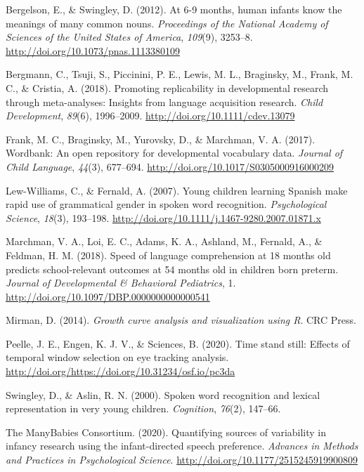 \documentclass[10pt, letterpaper]{article}
\begin{document}
\setlength{\parindent}{-0.1in} 
\setlength{\leftskip}{0.125in}

\noindent

\hypertarget{refs}{}
\leavevmode\hypertarget{ref-Bergelson2012a}{}%
Bergelson, E., \& Swingley, D. (2012). At 6-9 months, human infants know
the meanings of many common nouns. \emph{Proceedings of the National
Academy of Sciences of the United States of America}, \emph{109}(9),
3253--8. \url{http://doi.org/10.1073/pnas.1113380109}

\leavevmode\hypertarget{ref-Bergmann2018}{}%
Bergmann, C., Tsuji, S., Piccinini, P. E., Lewis, M. L., Braginsky, M.,
Frank, M. C., \& Cristia, A. (2018). Promoting replicability in
developmental research through meta-analyses: Insights from language
acquisition research. \emph{Child Development}, \emph{89}(6),
1996--2009. \url{http://doi.org/10.1111/cdev.13079}

\leavevmode\hypertarget{ref-Frank2016}{}%
Frank, M. C., Braginsky, M., Yurovsky, D., \& Marchman, V. A. (2017).
Wordbank: An open repository for developmental vocabulary data.
\emph{Journal of Child Language}, \emph{44}(3), 677--694.
\url{http://doi.org/10.1017/S0305000916000209}

\leavevmode\hypertarget{ref-Lew-Williams2007}{}%
Lew-Williams, C., \& Fernald, A. (2007). Young children learning Spanish
make rapid use of grammatical gender in spoken word recognition.
\emph{Psychological Science}, \emph{18}(3), 193--198.
\url{http://doi.org/10.1111/j.1467-9280.2007.01871.x}

\leavevmode\hypertarget{ref-Marchman2018}{}%
Marchman, V. A., Loi, E. C., Adams, K. A., Ashland, M., Fernald, A., \&
Feldman, H. M. (2018). Speed of language comprehension at 18 months old
predicts school-relevant outcomes at 54 months old in children born
preterm. \emph{Journal of Developmental \& Behavioral Pediatrics}, 1.
\url{http://doi.org/10.1097/DBP.0000000000000541}

\leavevmode\hypertarget{ref-Mirman2014}{}%
Mirman, D. (2014). \emph{Growth curve analysis and visualization using
R}. CRC Press.

\leavevmode\hypertarget{ref-Peelle2020}{}%
Peelle, J. E., Engen, K. J. V., \& Sciences, B. (2020). Time stand
still: Effects of temporal window selection on eye tracking analysis.
\url{http://doi.org/https://doi.org/10.31234/osf.io/pc3da}

\leavevmode\hypertarget{ref-Swingley2000}{}%
Swingley, D., \& Aslin, R. N. (2000). Spoken word recognition and
lexical representation in very young children. \emph{Cognition},
\emph{76}(2), 147--66.

\leavevmode\hypertarget{ref-TheManyBabiesConsortium2020}{}%
The ManyBabies Consortium. (2020). Quantifying sources of variability in
infancy research using the infant-directed speech preference.
\emph{Advances in Methods and Practices in Psychological Science}.
\url{http://doi.org/10.1177/2515245919900809}


\end{document}
